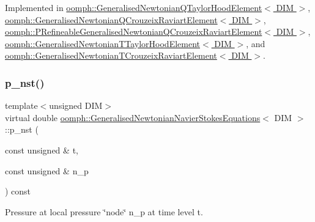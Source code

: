 Implemented in \hyperlink{classoomph_1_1GeneralisedNewtonianQTaylorHoodElement_ab63500fdebdaa2123b503af982467d8a}{oomph\+::\+Generalised\+Newtonian\+Q\+Taylor\+Hood\+Element$<$ D\+I\+M $>$}, \hyperlink{classoomph_1_1GeneralisedNewtonianQCrouzeixRaviartElement_aa4293ea7acc0f6bc4cd9e7fe2248b726}{oomph\+::\+Generalised\+Newtonian\+Q\+Crouzeix\+Raviart\+Element$<$ D\+I\+M $>$}, \hyperlink{classoomph_1_1PRefineableGeneralisedNewtonianQCrouzeixRaviartElement_a2aa0981d2fccc40fe3b94763901ff844}{oomph\+::\+P\+Refineable\+Generalised\+Newtonian\+Q\+Crouzeix\+Raviart\+Element$<$ D\+I\+M $>$}, \hyperlink{classoomph_1_1GeneralisedNewtonianTTaylorHoodElement_a014b6af2514d0b354997402d3145dc17}{oomph\+::\+Generalised\+Newtonian\+T\+Taylor\+Hood\+Element$<$ D\+I\+M $>$}, and \hyperlink{classoomph_1_1GeneralisedNewtonianTCrouzeixRaviartElement_aacae104194ac35d57f2172372e0d90a5}{oomph\+::\+Generalised\+Newtonian\+T\+Crouzeix\+Raviart\+Element$<$ D\+I\+M $>$}.

\mbox{\label{classoomph_1_1GeneralisedNewtonianNavierStokesEquations_a82eebde146ffb1b65a6c1ed8583c87f6}} 
\subsubsection{\texorpdfstring{p\+\_\+nst()}{p\_nst()}\hspace{0.1cm}{\footnotesize\ttfamily [2/2]}}
{\footnotesize\ttfamily template$<$unsigned D\+IM$>$ \\
virtual double \hyperlink{classoomph_1_1GeneralisedNewtonianNavierStokesEquations}{oomph\+::\+Generalised\+Newtonian\+Navier\+Stokes\+Equations}$<$ D\+IM $>$\+::p\+\_\+nst (\begin{DoxyParamCaption}\item[{const unsigned \&}]{t,  }\item[{const unsigned \&}]{n\+\_\+p }\end{DoxyParamCaption}) const\hspace{0.3cm}{\ttfamily [pure virtual]}}



Pressure at local pressure \char`\"{}node\char`\"{} n\+\_\+p at time level t. 



